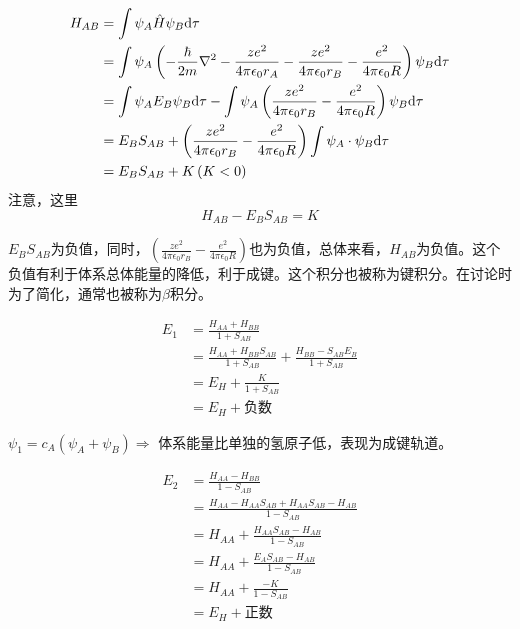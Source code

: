 \begin{align*}
	H_{AB} & = \int \psi_A \hat{H} \psi_B \mathrm{d} \tau                                                                                                                                     \\
	       & = \int \psi_A \left( -\frac{\hbar}{2m} \nabla^2 - \frac{ze^2}{4\pi\epsilon_0r_A} - \frac{ze^2}{4\pi\epsilon_0r_B} -  \frac{e^2}{4\pi\epsilon_0R}  \right) \psi_B \mathrm{d} \tau \\
	       & = \int \psi_A E_B \psi_B \mathrm{d} \tau - \int \psi_A \left(\frac{ze^2}{4\pi\epsilon_0r_B} - \frac{e^2}{4\pi\epsilon_0R} \right) \psi_B \mathrm{d} \tau                                 \\
	       & = E_BS_{AB} +  \left(\frac{ze^2}{4\pi\epsilon_0r_B} - \frac{e^2}{4\pi\epsilon_0R} \right) \int \psi_A \cdot \psi_B \mathrm{d} \tau                                               \\
	       & = E_BS_{AB} + K \left( K < 0 \right)                                                                                                                                     \\
\end{align*}
注意，这里
\begin{equation*}
	H_{AB} - E_BS_{AB} = K
\end{equation*}

$E_BS_{AB}$为负值，同时，$\left(\frac{ze^2}{4\pi\epsilon_0r_B} - \frac{e^2}{4\pi\epsilon_0R} \right)$也为负值，总体来看，$H_{AB}$为负值。这个负值有利于体系总体能量的降低，利于成键。这个积分也被称为键积分。在讨论时为了简化，通常也被称为$\beta$积分。


\begin{align*}
	E_1 & = \frac{H_{AA} + H_{BB}}{1 + S_{AB}}                                               \\
	    & = \frac{H_{AA} + H_{BB}S_{AB}}{1 + S_{AB}} + \frac{H_{BB} - S_{AB}E_B}{1 + S_{AB}} \\
	    & = E_H + \frac{K}{1 + S_{AB}}                                                       \\
	    & = E_H + \mbox{负数}
\end{align*}

$\psi_1 = c_A \left( \psi_A + \psi_B \right) \Rightarrow$ 体系能量比单独的氢原子低，表现为成键轨道。

\begin{align*}
	E_2 & = \frac{H_{AA} - H_{BB}}{1 - S_{AB}}                               \\
	    & = \frac{H_{AA} - H_{AA}S_{AB} + H_{AA}S_{AB} - H_{AB}}{1 - S_{AB}} \\
	    & = H_{AA} + \frac{H_{AA}S_{AB} - H_{AB}}{1 - S_{AB}}                \\
	    & = H_{AA} + \frac{E_AS_{AB} - H_{AB}}{1 - S_{AB}}                   \\
	    & = H_{AA} + \frac{-K}{1 - S_{AB}}                                   \\
	    & = E_H + \mbox{正数}
\end{align*}

